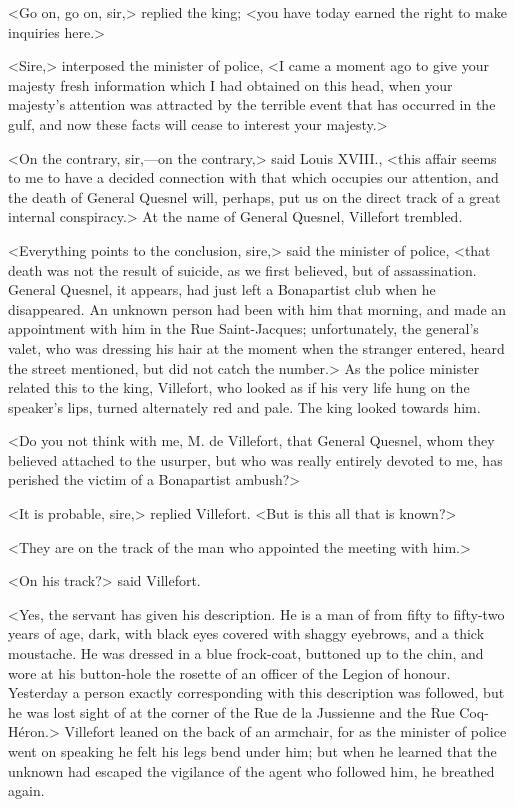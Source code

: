 <Go on, go on, sir,> replied the king; <you have today earned the right to make inquiries here.> 

 <Sire,> interposed the minister of police, <I came a moment ago to give your majesty fresh information which I had obtained on this head, when your majesty's attention was attracted by the terrible event that has occurred in the gulf, and now these facts will cease to interest your majesty.> 

 <On the contrary, sir,—on the contrary,> said Louis XVIII., <this affair seems to me to have a decided connection with that which occupies our attention, and the death of General Quesnel will, perhaps, put us on the direct track of a great internal conspiracy.> At the name of General Quesnel, Villefort trembled. 

 <Everything points to the conclusion, sire,> said the minister of police, <that death was not the result of suicide, as we first believed, but of assassination. General Quesnel, it appears, had just left a Bonapartist club when he disappeared. An unknown person had been with him that morning, and made an appointment with him in the Rue Saint-Jacques; unfortunately, the general's valet, who was dressing his hair at the moment when the stranger entered, heard the street mentioned, but did not catch the number.> As the police minister related this to the king, Villefort, who looked as if his very life hung on the speaker's lips, turned alternately red and pale. The king looked towards him. 

 <Do you not think with me, M. de Villefort, that General Quesnel, whom they believed attached to the usurper, but who was really entirely devoted to me, has perished the victim of a Bonapartist ambush?> 

 <It is probable, sire,> replied Villefort. <But is this all that is known?> 

 <They are on the track of the man who appointed the meeting with him.> 

 <On his track?> said Villefort. 

 <Yes, the servant has given his description. He is a man of from fifty to fifty-two years of age, dark, with black eyes covered with shaggy eyebrows, and a thick moustache. He was dressed in a blue frock-coat, buttoned up to the chin, and wore at his button-hole the rosette of an officer of the Legion of honour. Yesterday a person exactly corresponding with this description was followed, but he was lost sight of at the corner of the Rue de la Jussienne and the Rue Coq-Héron.> Villefort leaned on the back of an armchair, for as the minister of police went on speaking he felt his legs bend under him; but when he learned that the unknown had escaped the vigilance of the agent who followed him, he breathed again. 

